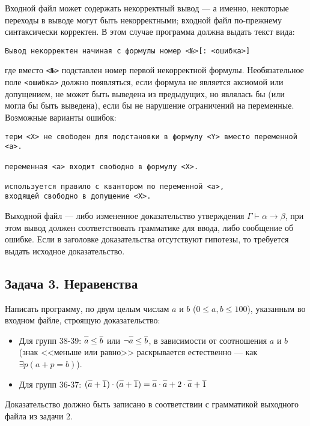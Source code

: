 \documentclass[11pt,a4paper,oneside]{article}
\begin{document}
Входной файл может содержать некорректный вывод --- а именно, некоторые переходы
в выводе могут быть некорректными; входной файл по-прежнему синтаксически корректен.
В этом случае программа должна выдать текст
вида: 
\begin{verbatim}
Вывод некорректен начиная с формулы номер <№>[: <ошибка>]
\end{verbatim}
где вместо \texttt{<№>} подставлен номер первой некорректной формулы. Необязательное поле
\texttt{<ошибка>} должно появляться, если формула не является аксиомой или допущением,
не может быть выведена из предыдущих, но являлась бы (или могла бы быть выведена), 
если бы не нарушение ограничений на переменные. Возможные варианты ошибок:
\begin{verbatim}
терм <X> не свободен для подстановки в формулу <Y> вместо переменной <a>.

переменная <a> входит свободно в формулу <X>.

используется правило с квантором по переменной <a>, 
входящей свободно в допущение <X>.
\end{verbatim}

Выходной файл --- либо измененное доказательство утверждения $\Gamma \vdash \alpha \rightarrow \beta$,
при этом вывод должен соответствовать грамматике для ввода, либо сообщение об ошибке.
Если в заголовке доказательства отсутствуют гипотезы, то требуется выдать исходное доказательство.

\subsection*{Задача 3. Неравенства}
Написать программу, по двум целым числам $a$ и $b$ ($0 \le a,b \le 100$), указанным во входном файле,
строящую доказательство:

\begin{itemize}
\item Для групп 38-39: $\overline{\vphantom{b}a} \le \overline{b}$ или 
$\neg\overline{\vphantom{b}a} \le \overline{b}$, в зависимости от соотношения $a$ и $b$ (знак 
<<меньше или равно>> раскрывается естественно --- как $\exists p (a+p = b)$).

\item Для групп 36-37: $(\overline{\vphantom{1}a}+\overline{1})\cdot (\overline{\vphantom{1}a}+\overline{1}) 
 = \overline{\vphantom{1}a}\cdot\overline{\vphantom{1}a} + 2\cdot \overline{\vphantom{1}a} + \overline{1}$
\end{itemize}

Доказательство должно быть записано в соответствии с грамматикой выходного файла из задачи 2.
\end{document}
